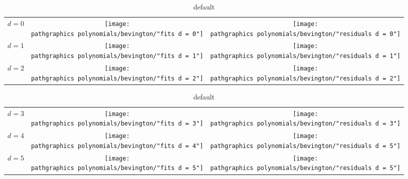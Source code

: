 \begin{table}[t]
	\begin{center}
		\begin{tabular}{lcc}
		  $d=0$ & \raisebox{-0.57575\height}{\texttt{[image: \\pathgraphics polynomials/bevington/"fits d = 0"]}}
		        & \raisebox{-0.57575\height}{\texttt{[image: \\pathgraphics polynomials/bevington/"residuals d = 0"]}} \\[80pt]
		  $d=1$ & \raisebox{-0.57575\height}{\texttt{[image: \\pathgraphics polynomials/bevington/"fits d = 1"]}}
		        & \raisebox{-0.57575\height}{\texttt{[image: \\pathgraphics polynomials/bevington/"residuals d = 1"]}} \\[80pt]
		  $d=2$ & \raisebox{-0.575\height}{\texttt{[image: \\pathgraphics polynomials/bevington/"fits d = 2"]}}
		        & \raisebox{-0.575\height}{\texttt{[image: \\pathgraphics polynomials/bevington/"residuals d = 2"]}} \\[80pt]
		\end{tabular}
	\end{center}
	\caption{default}
\end{table}%

\begin{table}[t]
	\begin{center}
		\begin{tabular}{lcc}
		  $d=3$ & \raisebox{-0.575\height}{\texttt{[image: \\pathgraphics polynomials/bevington/"fits d = 3"]}}
		        & \raisebox{-0.575\height}{\texttt{[image: \\pathgraphics polynomials/bevington/"residuals d = 3"]}} \\[80pt]
		  $d=4$ & \raisebox{-0.575\height}{\texttt{[image: \\pathgraphics polynomials/bevington/"fits d = 4"]}}
		        & \raisebox{-0.575\height}{\texttt{[image: \\pathgraphics polynomials/bevington/"residuals d = 5"]}} \\[80pt]
		  $d=5$ & \raisebox{-0.575\height}{\texttt{[image: \\pathgraphics polynomials/bevington/"fits d = 5"]}}
		        & \raisebox{-0.575\height}{\texttt{[image: \\pathgraphics polynomials/bevington/"residuals d = 5"]}} \\[80pt]
		\end{tabular}
	\end{center}
	\caption{default}
\end{table}%

